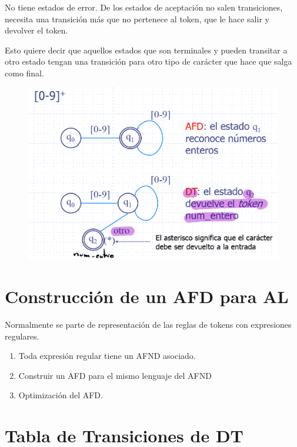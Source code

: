 \documentclass[12pt, twoside, openright]{report} %
\begin{document}
No tiene estados de error. De los estados de aceptación no salen
transiciones, necesita una transición más que no pertenece al token, que
le hace salir y devolver el token.

Esto quiere decir que aquellos estados que son terminales y pueden
transitar a otro estado tengan una transición para otro tipo de carácter
que hace que salga como final.

\begin{figure}[H]
	{\includegraphics[scale=.25]{Untitled 30.png}}
\end{figure}

\section{Construcción de un AFD para AL}

Normalmente se parte de representación de las reglas de tokens con
expresiones regulares.

\begin{enumerate}
\def\labelenumi{\arabic{enumi}.}

\item
  Toda expresión regular tiene un AFND asociado.
\item
  Construir un AFD para el mismo lenguaje del AFND
\item
  Optimización del AFD.
\end{enumerate}


\section{Tabla de Transiciones de DT}
\end{document}
